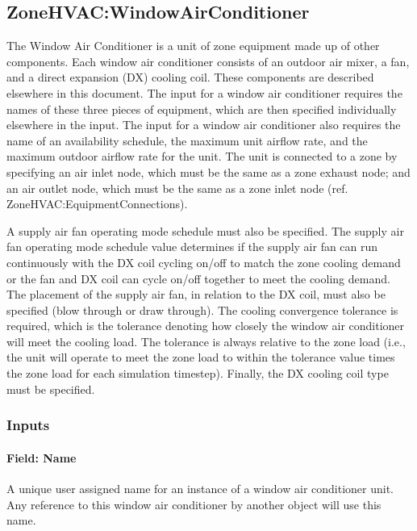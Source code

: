 \subsection{ZoneHVAC:WindowAirConditioner}\label{zonehvacwindowairconditioner}

The Window Air Conditioner is a unit of zone equipment made up of other components. Each window air conditioner consists of an outdoor air mixer, a fan, and a direct expansion (DX) cooling coil. These components are described elsewhere in this document. The input for a window air conditioner requires the names of these three pieces of equipment, which are then specified individually elsewhere in the input. The input for a window air conditioner also requires the name of an availability schedule, the maximum unit airflow rate, and the maximum outdoor airflow rate for the unit. The unit is connected to a zone by specifying an air inlet node, which must be the same as a zone exhaust node; and an air outlet node, which must be the same as a zone inlet node (ref. ZoneHVAC:EquipmentConnections).

A supply air fan operating mode schedule must also be specified. The supply air fan operating mode schedule value determines if the supply air fan can run continuously with the DX coil cycling on/off to match the zone cooling demand or the fan and DX coil can cycle on/off together to meet the cooling demand. The placement of the supply air fan, in relation to the DX coil, must also be specified (blow through or draw through). The cooling convergence tolerance is required, which is the tolerance denoting how closely the window air conditioner will meet the cooling load. The tolerance is always relative to the zone load (i.e., the unit will operate to meet the zone load to within the tolerance value times the zone load for each simulation timestep). Finally, the DX cooling coil type must be specified.

\subsubsection{Inputs}\label{inputs-7-031}

\paragraph{Field: Name}\label{field-name-7-025}

A unique user assigned name for an instance of a window air conditioner unit. Any reference to this window air conditioner by another object will use this name.

